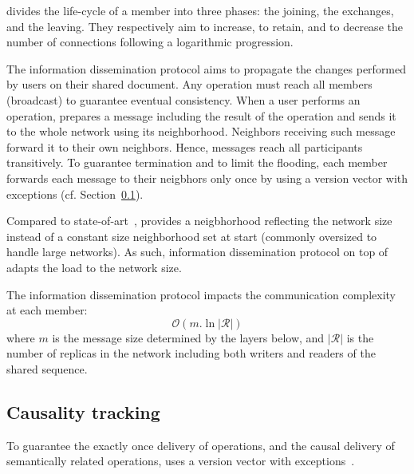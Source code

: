 \begin{asparadesc}
  \SPRAY divides the life-cycle of a member into three phases: the joining, the
  exchanges, and the leaving. They respectively aim to increase, to retain, and
  to decrease the number of connections following a logarithmic progression.

\item [The information dissemination protocol]\cite{birman1999bimodal} aims to
  propagate the changes performed by users on their shared document. Any
  operation must reach all members (broadcast) to guarantee eventual
  consistency.  When a user performs an operation, \CRATE prepares a message
  including the result of the operation and sends it to the whole network using
  its neighborhood. Neighbors receiving such message forward it to their own
  neighbors. Hence, messages reach all participants transitively. To guarantee
  termination and to limit the flooding, each member forwards each message to
  their neigbhors only once by using a version vector with exceptions
  (cf. Section~\ref{subsec:causality}).

  Compared to state-of-art~\cite{ganesh2003peer, jelasity2007gossip,
    voulgaris2005cyclon}, \SPRAY provides a neigbhorhood reflecting the network
  size instead of a constant size neighborhood set at start (commonly oversized
  to handle large networks). As such, information dissemination protocol on top
  of \SPRAY adapts the load to the network size.

  The information dissemination protocol impacts the communication complexity at
  each member:
  \begin{equation}
    \mathcal{O}(m.\ln |\mathcal{R}|)
  \end{equation}
  where $m$ is the message size determined by the layers below, and
  $|\mathcal{R}|$ is the number of replicas in the network including both
  writers and readers of the shared sequence.
\end{asparadesc}

\subsection{Causality tracking}
\label{subsec:causality}

To guarantee the exactly once delivery of operations, and the causal delivery of
semantically related operations, \CRATE uses a version vector with
exceptions~\cite{malkhi2007concise, mukund2014optimized}.


